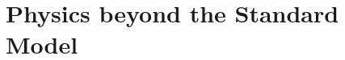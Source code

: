 \documentclass[main.tex]{subfiles}
\begin{document}
\section{Physics beyond the Standard Model}

\end{document}
